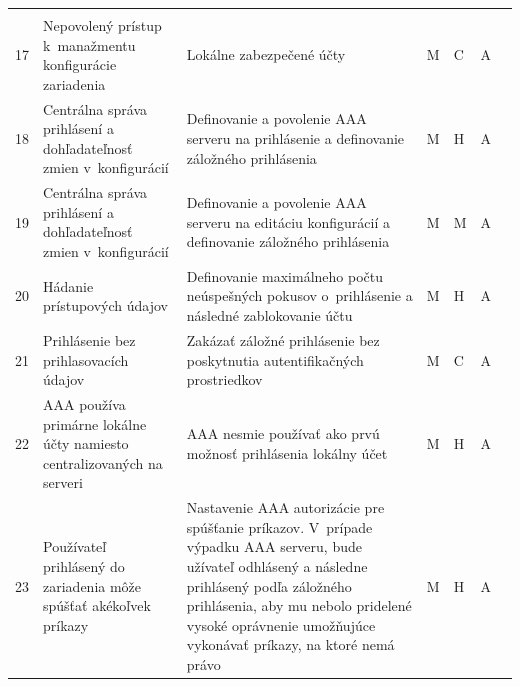 \begin{longtable}[!htbp]{|C{2.5em}L{11em}L{11em}C{2.5em}C{4em}C{5em}L{2.5em}|}
	\cite{Graesser2001}	\\
	 17	&Nepovolený prístup k~manažmentu konfigurácie zariadenia	&Lokálne zabezpečené účty	&M	&C	&A	& \cite{Singh2018}
	
	\cite{CIS_DrTLsgXv24lxeIIM}	\\
	18	&Centrálna správa prihlásení a dohľadateľnosť zmien v~konfigurácií	&Definovanie a povolenie AAA serveru na prihlásenie a definovanie záložného prihlásenia	&M	&H	&A	& \cite{Akin2002}
	
	\cite{CIS_DrTLsgXv24lxeIIM} 
	
	\cite{McMillan2018}
	
	\cite{Graesser2001}	\\
	 19	&Centrálna správa prihlásení a dohľadateľnosť zmien v~konfigurácií	&Definovanie a povolenie AAA serveru na editáciu konfigurácií a definovanie záložného prihlásenia	&M	&M	&A	& \cite{CIS_DrTLsgXv24lxeIIM}
	
	\cite{Graesser2001}	\\
	20	&Hádanie prístupových údajov	&Definovanie maximálneho počtu neúspešných pokusov o~prihlásenie a následné zablokovanie účtu	&M	&H	&A	& \cite{CIS_DrTLsgXv24lxeIIM}
	
	\cite{Graesser2001}	\\
	 21	&Prihlásenie bez prihlasovacích údajov	&Zakázať záložné prihlásenie bez poskytnutia autentifikačných prostriedkov	&M	&C	&A	& \cite{Singh2018}	\\
	22	&AAA používa primárne lokálne účty namiesto centralizovaných na serveri	&AAA nesmie používať ako prvú možnosť prihlásenia lokálny účet 	&M	&H	&A	& \cite{CIS_DrTLsgXv24lxeIIM}
	
	\cite{Graesser2001}	\\
	 23	&Používateľ prihlásený do zariadenia môže spúšťať akékoľvek príkazy	&Nastavenie AAA autorizácie pre spúšťanie príkazov. V~prípade výpadku AAA serveru, bude užívateľ odhlásený a následne prihlásený podľa  záložného prihlásenia, aby mu nebolo pridelené vysoké oprávnenie umožňujúce vykonávať príkazy, na ktoré nemá právo	&M	&H	&A	& \cite{Graesser2001}
	

\end{longtable}
